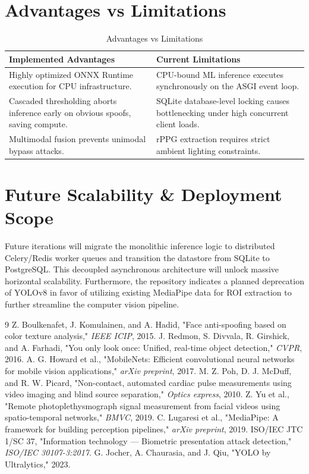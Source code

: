 \section{Advantages vs Limitations}
\begin{table}[H]
\centering
\caption{Advantages vs Limitations}
\begin{tabularx}{\textwidth}{|X|X|}
\hline
\textbf{Implemented Advantages} & \textbf{Current Limitations} \\
\hline
Highly optimized ONNX Runtime execution for CPU infrastructure. & CPU-bound ML inference executes synchronously on the ASGI event loop. \\
Cascaded thresholding aborts inference early on obvious spoofs, saving compute. & SQLite database-level locking causes bottlenecking under high concurrent client loads. \\
Multimodal fusion prevents unimodal bypass attacks. & rPPG extraction requires strict ambient lighting constraints. \\
\hline
\end{tabularx}
\end{table}

\section{Future Scalability \& Deployment Scope}
Future iterations will migrate the monolithic inference logic to distributed Celery/Redis worker queues and transition the datastore from SQLite to PostgreSQL. This decoupled asynchronous architecture will unlock massive horizontal scalability. Furthermore, the repository indicates a planned deprecation of YOLOv8 in favor of utilizing existing MediaPipe data for ROI extraction to further streamline the computer vision pipeline.

\begin{thebibliography}{9}
 Z. Boulkenafet, J. Komulainen, and A. Hadid, "Face anti-spoofing based on color texture analysis," \textit{IEEE ICIP}, 2015.
 J. Redmon, S. Divvala, R. Girshick, and A. Farhadi, "You only look once: Unified, real-time object detection," \textit{CVPR}, 2016.
 A. G. Howard et al., "MobileNets: Efficient convolutional neural networks for mobile vision applications," \textit{arXiv preprint}, 2017.
 M. Z. Poh, D. J. McDuff, and R. W. Picard, "Non-contact, automated cardiac pulse measurements using video imaging and blind source separation," \textit{Optics express}, 2010.
 Z. Yu et al., "Remote photoplethysmograph signal measurement from facial videos using spatio-temporal networks," \textit{BMVC}, 2019.
 C. Lugaresi et al., "MediaPipe: A framework for building perception pipelines," \textit{arXiv preprint}, 2019.
 ISO/IEC JTC 1/SC 37, "Information technology — Biometric presentation attack detection," \textit{ISO/IEC 30107-3:2017}.
 G. Jocher, A. Chaurasia, and J. Qiu, "YOLO by Ultralytics," 2023.
\end{thebibliography}